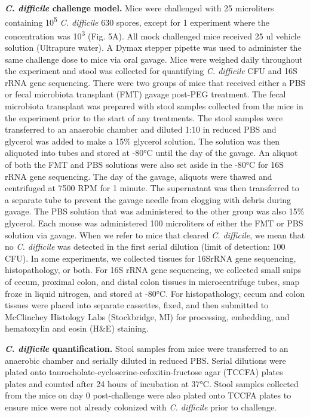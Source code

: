 \documentclass[
  11pt,
]{article}
\begin{document}
\textbf{\emph{C. difficile} challenge model.} Mice were challenged with
25 microliters containing 10\textsuperscript{5} \emph{C. difficile} 630
spores, except for 1 experiment where the concentration was
10\textsuperscript{3} (Fig. 5A). All mock challenged mice received 25 ul
vehicle solution (Ultrapure water). A Dymax stepper pipette was used to
administer the same challenge dose to mice via oral gavage. Mice were
weighed daily throughout the experiment and stool was collected for
quantifying \emph{C. difficile} CFU and 16S rRNA gene sequencing. There
were two groups of mice that received either a PBS or fecal microbiota
transplant (FMT) gavage post-PEG treatment. The fecal microbiota
transplant was prepared with stool samples collected from the mice in
the experiment prior to the start of any treatments. The stool samples
were transferred to an anaerobic chamber and diluted 1:10 in reduced PBS
and glycerol was added to make a 15\% glycerol solution. The solution
was then aliquoted into tubes and stored at -80°C until the day of the
gavage. An aliquot of both the FMT and PBS solutions were also set aside
in the -80°C for 16S rRNA gene sequencing. The day of the gavage,
aliquots were thawed and centrifuged at 7500 RPM for 1 minute. The
supernatant was then transferred to a separate tube to prevent the
gavage needle from clogging with debris during gavage. The PBS solution
that was administered to the other group was also 15\% glycerol. Each
mouse was administered 100 microliters of either the FMT or PBS solution
via gavage. When we refer to mice that cleared \emph{C. difficile}, we
mean that no \emph{C. difficile} was detected in the first serial
dilution (limit of detection: 100 CFU). In some experiments, we
collected tissues for 16SrRNA gene sequencing, histopathology, or both.
For 16S rRNA gene sequencing, we collected small snips of cecum,
proximal colon, and distal colon tissues in microcentrifuge tubes, snap
froze in liquid nitrogen, and stored at -80°C. For histopathology, cecum
and colon tissues were placed into separate cassettes, fixed, and then
submitted to McClinchey Histology Labs (Stockbridge, MI) for processing,
embedding, and hematoxylin and eosin (H\&E) staining.

\textbf{\emph{C. difficile} quantification.} Stool samples from mice
were transferred to an anaerobic chamber and serially diluted in reduced
PBS. Serial dilutions were plated onto
taurocholate-cycloserine-cefoxitin-fructose agar (TCCFA) plates plates
and counted after 24 hours of incubation at 37°C. Stool samples
collected from the mice on day 0 post-challenge were also plated onto
TCCFA plates to ensure mice were not already colonized with \emph{C.
difficile} prior to challenge.
\end{document}
